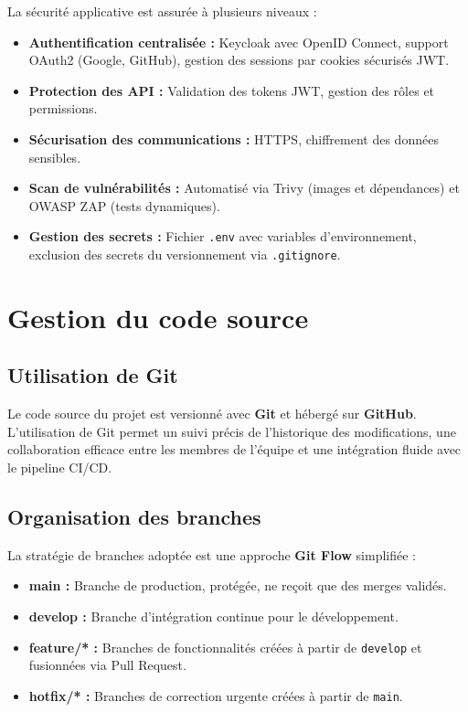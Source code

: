 La sécurité applicative est assurée à plusieurs niveaux :

\begin{itemize}
    \item \textbf{Authentification centralisée :} Keycloak avec OpenID Connect, support OAuth2 (Google, GitHub), gestion des sessions par cookies sécurisés JWT.
    \item \textbf{Protection des API :} Validation des tokens JWT, gestion des rôles et permissions.
    \item \textbf{Sécurisation des communications :} HTTPS, chiffrement des données sensibles.
    \item \textbf{Scan de vulnérabilités :} Automatisé via Trivy (images et dépendances) et OWASP ZAP (tests dynamiques).
    \item \textbf{Gestion des secrets :} Fichier \texttt{.env} avec variables d'environnement, exclusion des secrets du versionnement via \texttt{.gitignore}.
\end{itemize}

\section{Gestion du code source}
\label{sec:realisation:git}

\subsection{Utilisation de Git}
\label{subsec:realisation:git-utilisation}

Le code source du projet est versionné avec \textbf{Git} et hébergé sur \textbf{GitHub}. L'utilisation de Git permet un suivi précis de l'historique des modifications, une collaboration efficace entre les membres de l'équipe et une intégration fluide avec le pipeline CI/CD.

\subsection{Organisation des branches}
\label{subsec:realisation:git-branches}

La stratégie de branches adoptée est une approche \textbf{Git Flow} simplifiée :

\begin{itemize}
    \item \textbf{main :} Branche de production, protégée, ne reçoit que des merges validés.
    \item \textbf{develop :} Branche d'intégration continue pour le développement.
    \item \textbf{feature/* :} Branches de fonctionnalités créées à partir de \texttt{develop} et fusionnées via Pull Request.
    \item \textbf{hotfix/* :} Branches de correction urgente créées à partir de \texttt{main}.
\end{itemize}

